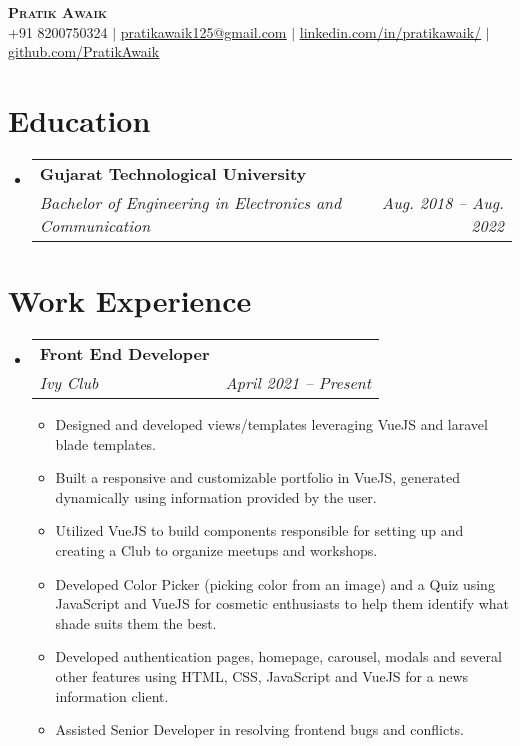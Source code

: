 \documentclass[letterpaper,12pt]{article}
\makeatletter
\newcommand{\resumeItem}[1]{
  \item\small{
    {#1 \vspace{-2pt}}
  }
}
\newcommand{\resumeSubheading}[4]{
  \vspace{-2pt}\item
    \begin{tabular*}{0.97\textwidth}[t]{l@{\extracolsep{\fill}}r}
      \textbf{#1} & #2 \\
      \textit{\small#3} & \textit{\small #4} \\
    \end{tabular*}\vspace{-7pt}
}
\newcommand{\resumeSubHeadingListStart}{\begin{itemize}[leftmargin=0.15in, label={}]}
\newcommand{\resumeSubHeadingListEnd}{\end{itemize}}
\newcommand{\resumeItemListStart}{\begin{itemize}}
\newcommand{\resumeItemListEnd}{\end{itemize}\vspace{-5pt}}
\makeatother
\begin{document}

\begin{center}
    \textbf{\Huge \scshape Pratik Awaik} \\ \vspace{1pt}
    \small +91 8200750324 $|$
    \href{mailto:pratikawaik125@gmail.com}{\underline{pratikawaik125@gmail.com}} $|$ 
    \href{https://www.linkedin.com/in/pratikawaik/}{\underline{linkedin.com/in/pratikawaik/}} $|$
    \href{https://github.com/PratikAwaik}{\underline{github.com/PratikAwaik}}
    
\end{center}

\section{Education}
  \resumeSubHeadingListStart
    \resumeSubheading
      {Gujarat Technological University}{}
      {Bachelor of Engineering in Electronics and Communication}{Aug. 2018 -- Aug. 2022}
      
      
  \resumeSubHeadingListEnd

\section{Work Experience}
  \resumeSubHeadingListStart

    \resumeSubheading
      {Front End Developer}{}
      {Ivy Club}{April 2021 -- Present}
      \resumeItemListStart
        \resumeItem{Designed and developed views/templates leveraging VueJS and laravel blade templates.}
        \resumeItem{Built a responsive and customizable portfolio in VueJS, generated dynamically using information provided by the user.}
        \resumeItem{Utilized VueJS to build components responsible for setting up and creating a Club to organize meetups and workshops.}
        \resumeItem{Developed Color Picker (picking color from an image) and a Quiz using JavaScript and VueJS for cosmetic enthusiasts to help them identify what shade suits them the best.}
        \resumeItem{Developed authentication pages, homepage, carousel, modals and several other features using HTML, CSS, JavaScript and VueJS for a news information client.}
        \resumeItem{Assisted Senior Developer in resolving frontend bugs and conflicts.}
      \resumeItemListEnd    
  \resumeSubHeadingListEnd
\end{document}
